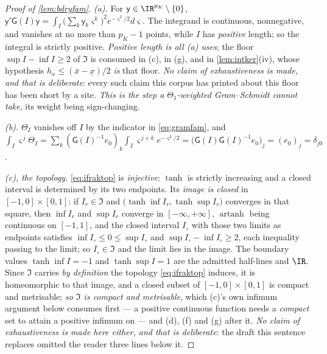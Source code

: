 \begin{proof}[Proof of \cref{lem:bdryfam}]
\emph{(a).} For $\mathsf y\in\IR^{p_K}\setminus\{0\}$,
$\mathsf y'\mathsf G(I)\mathsf y=\int_I\big(\sum_k\mathsf y_k\varsigma^{k}\big)^{2}e^{-\varsigma^{2}/2}d\varsigma$.
The integrand is continuous, nonnegative, and vanishes at no more than $p_K-1$ points, while $I$ has
\emph{positive} length; so the integral is strictly positive. \emph{Positive length is all (a) uses};
the floor $\sup I-\inf I\ge2$ of $\mathfrak I$ is consumed in (c), in \textup{(g)}, and in
\cref{lem:intker}\textup{(iv)}, whose hypothesis $h_x\le(\bar x-\underline x)/2$ \emph{is} that floor.
\emph{No claim of exhaustiveness is made, and that is deliberate}: every such claim this corpus has
printed about this floor has been short by a site. \emph{This is the step a
$\Theta_1$-weighted Gram--Schmidt cannot take}, its weight being sign-changing.

\emph{(b).} $\Theta_I$ vanishes off $I$ by the indicator in \eqref{eq:gramfam}, and
$\int_I\varsigma^{\,j}\Theta_I=\sum_k(\mathsf G(I)^{-1}e_0)_k\int_I\varsigma^{\,j+k}e^{-\varsigma^{2}/2}
=\big(\mathsf G(I)\mathsf G(I)^{-1}e_0\big)_j=(e_0)_j=\delta_{j0}$.

\emph{(c), the topology.} \eqref{eq:ifraktop} is \emph{injective}: $\tanh$ is strictly increasing and a
closed interval is determined by its two endpoints. Its \emph{image is closed} in $[-1,0]\times[0,1]$:
if $I_r\in\mathfrak I$ and $\big(\tanh\inf I_r,\tanh\sup I_r\big)$ converges in that square, then
$\inf I_r$ and $\sup I_r$ converge in $[-\infty,+\infty]$, $\operatorname{artanh}$ being continuous on
$[-1,1]$, and the closed interval $I_\circ$ with those two limits as endpoints satisfies
$\inf I_\circ\le0\le\sup I_\circ$ and $\sup I_\circ-\inf I_\circ\ge2$, each inequality passing to the
limit; so $I_\circ\in\mathfrak I$ and the limit lies in the image. The boundary values
$\tanh\inf I=-1$ and $\tanh\sup I=1$ are the admitted half-lines and $\IR$. Since $\mathfrak I$ carries
\emph{by definition} the topology \eqref{eq:ifraktop} induces, it is homeomorphic to that image, and a
closed subset of $[-1,0]\times[0,1]$ is compact and metrisable; \emph{so $\mathfrak I$ is compact and
metrisable}, which \textup{(c)}'s own infimum argument below consumes first --- a positive continuous
function needs a \emph{compact} set to attain a positive infimum on --- and \textup{(d)},
\textup{(f)} and \textup{(g)} after it. \emph{No claim of exhaustiveness is made here either, and
that is deliberate}: the draft this sentence replaces omitted the reader three lines below it.


\end{proof}
